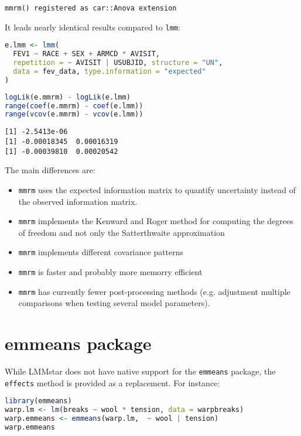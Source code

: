 \documentclass[12pt]{article}
\begin{document}
\label{}
\begin{verbatim}
mmrm() registered as car::Anova extension
\end{verbatim}


It leads nearly identical results compared to \texttt{lmm}:
\begin{lstlisting}[language=r,numbers=none]
e.lmm <- lmm(
  FEV1 ~ RACE + SEX + ARMCD * AVISIT,
  repetition = ~ AVISIT | USUBJID, structure = "UN",
  data = fev_data, type.information = "expected"
)
\end{lstlisting}
\begin{lstlisting}[language=r,numbers=none]
logLik(e.mmrm) - logLik(e.lmm)
range(coef(e.mmrm) - coef(e.lmm))
range(vcov(e.mmrm) - vcov(e.lmm))
\end{lstlisting}

\label{}
\begin{verbatim}
[1] -2.5413e-06
[1] -0.00018345  0.00016319
[1] -0.00039810  0.00020542
\end{verbatim}


The main differences are:
\begin{itemize}
\item \texttt{mmrm} uses the expected information matrix to quantify uncertainty
instead of the observed information matrix.
\item \texttt{mmrm} implements the Kenward and Roger method for computing the degrees of
freedom and not only the Satterthwaite approximation
\item \texttt{mmrm} implements different covariance patterns
\item \texttt{mmrm} is faster and probably more memorry efficient
\item \texttt{mmrm} has currently fewer post-processing methods (e.g. adjustment
multiple comparisons when testing several model parameters).
\end{itemize}

\clearpage
\section{emmeans package}
\label{sec:org92dc6bb}

While LMMstar does not have native support for the \texttt{emmeans} package,
the \texttt{effects} method is provided as a replacement. For instance:
\begin{lstlisting}[language=r,numbers=none]
library(emmeans)
warp.lm <- lm(breaks ~ wool * tension, data = warpbreaks)
warp.emmeans <- emmeans(warp.lm,  ~ wool | tension)
warp.emmeans
\end{lstlisting}
\end{document}
